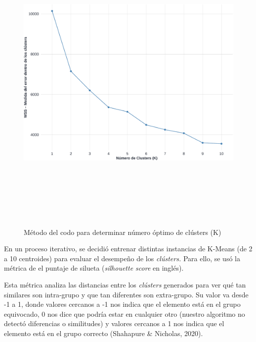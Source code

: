 \documentclass[
  12pt,
  letterpaper,
]{article}
\begin{document}
\begin{figure}

{\centering \includegraphics[width=0.8\linewidth,height=6in]{tesis_ver_final_files/figure-latex/grafico-codo-1} 

}

\caption{Método del codo para determinar número óptimo de clústers (K)}\label{fig:grafico-codo}
\end{figure}

En un proceso iterativo, se decidió entrenar distintas instancias de K-Means (de 2 a 10 centroides) para evaluar el desempeño de los \emph{clústers.} Para ello, se usó la métrica de el puntaje de silueta (\emph{silhouette score} en inglés).

Esta métrica analiza las distancias entre los \emph{clústers} generados para ver qué tan similares son intra-grupo y que tan diferentes son extra-grupo.
Su valor va desde -1 a 1, donde valores cercanos a -1 nos indica que el elemento está en el grupo equivocado, 0 nos dice que podría estar en cualquier otro (nuestro algoritmo no detectó diferencias o similitudes) y valores cercanos a 1 nos indica que el elemento está en el grupo correcto (Shahapure \& Nicholas, 2020).
\end{document}
